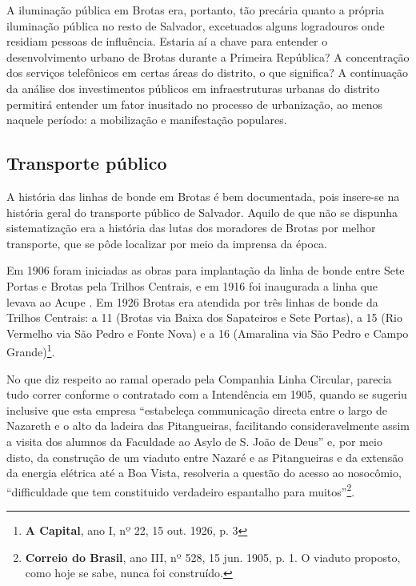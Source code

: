 A iluminação pública em Brotas era, portanto, tão precária quanto a própria iluminação pública no resto de Salvador, excetuados alguns logradouros onde residiam pessoas de influência. Estaria aí a chave para entender o desenvolvimento urbano de Brotas durante a Primeira República? A concentração dos serviços telefônicos em certas áreas do distrito, o que significa? A continuação da análise dos investimentos públicos em infraestruturas urbanas do distrito permitirá entender um fator inusitado no processo de urbanização, ao menos naquele período: a mobilização e manifestação populares.

\subsection{Transporte público}\label{subsec:transpub}

A história das linhas de bonde em Brotas é bem documentada, pois insere-se na história geral do transporte público de Salvador. Aquilo de que não se dispunha sistematização era a história das lutas dos moradores de Brotas por melhor transporte, que se pôde localizar por meio da imprensa da época.

Em 1906 foram iniciadas as obras para implantação da linha de bonde entre Sete Portas e Brotas pela Trilhos Centrais, e em 1916 foi inaugurada a linha que levava ao Acupe \cite[p.~299]{VASCONCELOS2002}. Em 1926 Brotas era atendida por três linhas de bonde da Trilhos Centrais: a 11 (Brotas via Baixa dos Sapateiros e Sete Portas), a 15 (Rio Vermelho via São Pedro e Fonte Nova) e a 16 (Amaralina via São Pedro e Campo Grande)\footnote{\textbf{A Capital}, ano I, nº 22, 15 out. 1926, p. 3}.

No que diz respeito ao ramal operado pela Companhia Linha Circular, parecia tudo correr conforme o contratado com a Intendência em 1905, quando se sugeriu inclusive que esta empresa ``estabeleça communicação directa entre o largo de Nazareth e o alto da ladeira das Pitangueiras, facilitando consideravelmente assim a visita dos alumnos da Faculdade ao Asylo de S. João de Deus'' e, por meio disto, da construção de um viaduto entre Nazaré e as Pitangueiras e da extensão da energia elétrica até a Boa Vista, resolveria a questão do acesso ao nosocômio, ``difficuldade que tem constituido verdadeiro espantalho para muitos''\footnote{\textbf{Correio do Brasil}, ano III, nº 528, 15 jun. 1905, p. 1. O viaduto proposto, como hoje se sabe, nunca foi construído.}. 

